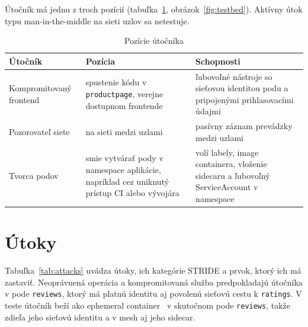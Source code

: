 Útočník má jednu z troch pozícií (tabuľka~\ref{tab:attackers}, obrázok~\ref{fig:testbed}). Aktívny útok typu man-in-the-middle na sieti uzlov sa netestuje.

\begin{table}[ht!]
  \centering
  \caption{Pozície útočníka}
  \label{tab:attackers}
  \footnotesize
  \renewcommand{\arraystretch}{1.15}
  \begin{tabularx}{\textwidth}{@{}>{\raggedright\arraybackslash}p{3.2cm}>{\raggedright\arraybackslash}X>{\raggedright\arraybackslash}X@{}}
    \toprule
    Útočník & Pozícia & Schopnosti \\
    \midrule
    Kompromitovaný frontend & spustenie kódu v \texttt{productpage}, verejne dostupnom frontende & ľubovoľné nástroje so sieťovou identitou podu a pripojenými prihlasovacími údajmi \\
    Pozorovateľ siete & na sieti medzi uzlami & pasívny záznam prevádzky medzi uzlami \\
    Tvorca podov & smie vytvárať pody v namespace aplikácie, napríklad cez uniknutý prístup CI alebo vývojára & volí labely, image containera, vloženie sidecaru a ľubovoľný ServiceAccount v namespace \\
    \bottomrule
  \end{tabularx}
\end{table}

\section{Útoky}

Tabuľka~\ref{tab:attacks} uvádza útoky, ich kategórie STRIDE a prvok, ktorý ich má zastaviť. Neoprávnená operácia a kompromitovaná služba predpokladajú útočníka v pode \texttt{reviews}, ktorý má platnú identitu aj povolenú sieťovú cestu k \texttt{ratings}. V teste útočník beží ako ephemeral container~\cite{k8s-ephemeral-containers} v skutočnom pode \texttt{reviews}, takže zdieľa jeho sieťovú identitu a v mesh aj jeho sidecar.

